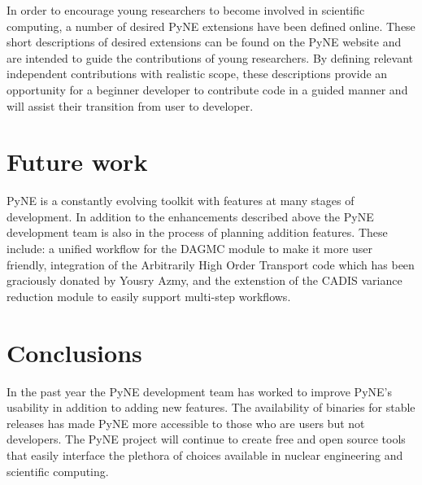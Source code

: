 \documentclass{anstrans}
\begin{document}
In order to encourage young researchers to become involved in scientific computing, a number of desired PyNE extensions have been defined online. These short descriptions of desired extensions can be found on the PyNE website and are intended to guide the contributions of young researchers. By defining relevant independent contributions with realistic scope, these descriptions provide an opportunity for a beginner developer to contribute code in a guided manner and will assist their transition from user to developer.

\section{Future work}

PyNE is a constantly evolving toolkit with features at many stages of 
development. In addition to the enhancements described above the PyNE
development team is also in the process of planning addition features.
These include: a unified workflow for the DAGMC module to make it more user
friendly, integration of the Arbitrarily High Order Transport code which has
been graciously donated by Yousry Azmy, and the extenstion of the CADIS
variance reduction module to easily support multi-step workflows. 

\section{Conclusions}

In the past year the PyNE development team has worked to improve PyNE's 
usability in addition to adding new features. The availability of binaries 
for stable releases has made PyNE more accessible to those who are users 
but not developers. The PyNE project will continue to create free and open 
source tools that easily interface the plethora of choices available in 
nuclear engineering and scientific computing. 

 
 
\end{document}
